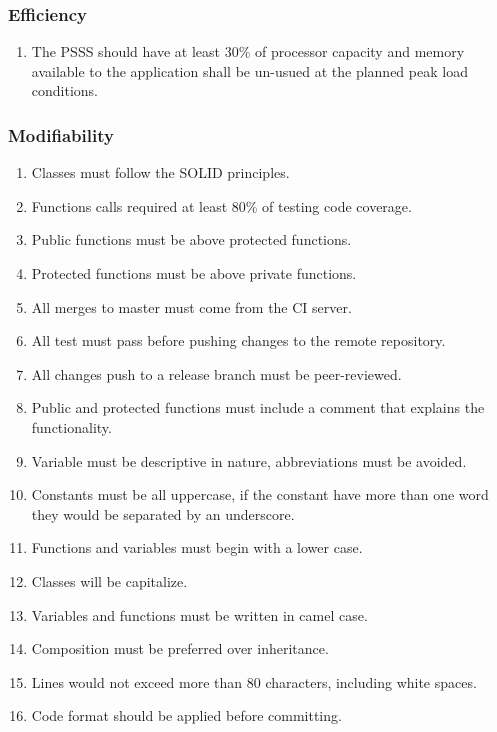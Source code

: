 \subsubsection{Efficiency}
\begin{enumerate}[label=EFF-\arabic*]
    \item The PSSS should have at least 30\% of processor capacity and memory 
    available to the application shall be un-usued at the planned 
    peak load conditions.
\end{enumerate}

\pagebreak

\subsubsection{Modifiability}
\begin{enumerate}[label=MOD-\arabic*]
    \item Classes must follow the SOLID principles. \cite{solid}
    \item Functions calls required at least 80\% of testing code coverage.
    \item Public functions must be above protected functions.
    \item Protected functions must be above private functions.
    \item All merges to master must come from the CI server.
    \item All test must pass before pushing changes to the remote repository.
    \item All changes push to a release branch must be peer-reviewed.
    \item Public and protected functions must include a comment that explains 
    the functionality.
    \item Variable must be descriptive in nature, abbreviations must be 
    avoided.
    \item Constants must be all uppercase, if the constant have more than one 
    word they would be separated by an underscore.
    \item Functions and variables must begin with a lower case.
    \item Classes will be capitalize.
    \item Variables and functions must be written in camel case.
    \item Composition must be preferred over inheritance.
    \item Lines would not exceed more than 80 characters, including white 
    spaces.
    \item Code format should be applied before committing.
\end{enumerate}

